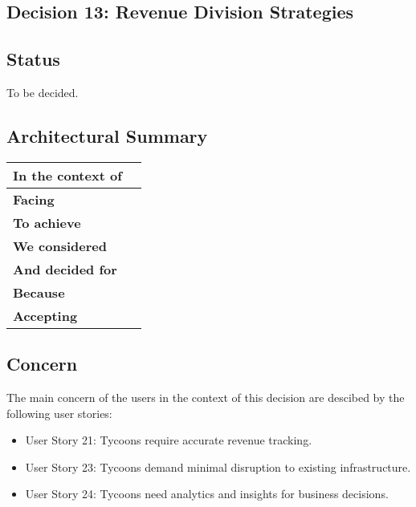 \subsection{Decision 13: Revenue Division Strategies}

\subsection*{Status}
To be decided.

\subsection*{Architectural Summary}
\begin{tabular}{|p{3.5cm}|p{10.5cm}|}
    \hline
    \textbf{In the context of} &  \\
    \hline
    \textbf{Facing} &  \\
    \hline
    \textbf{To achieve} & \\
    \hline
    \textbf{We considered} & \\
    \hline
    \textbf{And decided for} & \\
    \hline
    \textbf{Because} &  \\
    \hline
    \textbf{Accepting} &  \\
    \hline
\end{tabular}

\subsection*{Concern}
The main concern of the users in the context of this decision are descibed by the following user stories: 
\begin{itemize}
    \item User Story 21: Tycoons require accurate revenue tracking.
    \item User Story 23: Tycoons demand minimal disruption to existing infrastructure.
    \item User Story 24: Tycoons need analytics and insights for business decisions.
\end{itemize}

